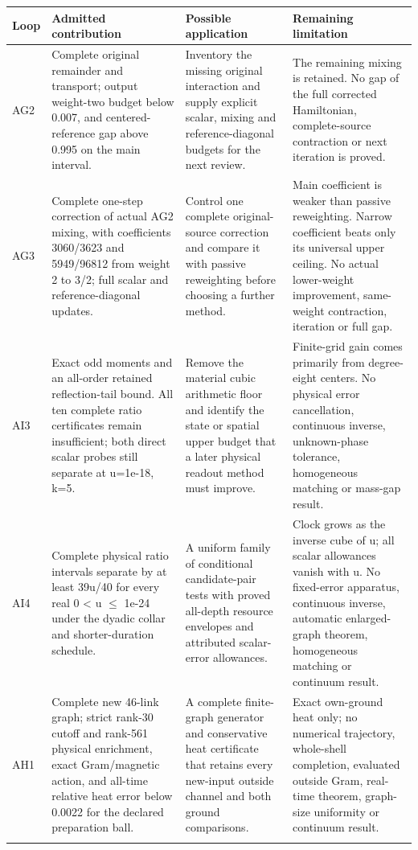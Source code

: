 \begingroup\small
\begin{longtable}{@{}>{\raggedright\arraybackslash}p{13mm}>{\raggedright\arraybackslash}p{52mm}>{\raggedright\arraybackslash}p{35mm}>{\raggedright\arraybackslash}p{48mm}@{}}
\toprule Loop & Admitted contribution & Possible application & Remaining limitation \\
\midrule\endhead
AG2 & Complete original remainder and transport; output weight-two budget below 0.007, and centered-reference gap above 0.995 on the main interval. & Inventory the missing original interaction and supply explicit scalar, mixing and reference-diagonal budgets for the next review. & The remaining mixing is retained. No gap of the full corrected Hamiltonian, complete-source contraction or next iteration is proved. \\ \addlinespace
AG3 & Complete one-step correction of actual AG2 mixing, with coefficients 3060/3623 and 5949/96812 from weight 2 to 3/2; full scalar and reference-diagonal updates. & Control one complete original-source correction and compare it with passive reweighting before choosing a further method. & Main coefficient is weaker than passive reweighting. Narrow coefficient beats only its universal upper ceiling. No actual lower-weight improvement, same-weight contraction, iteration or full gap. \\ \addlinespace
AI3 & Exact odd moments and an all-order retained reflection-tail bound. All ten complete ratio certificates remain insufficient; both direct scalar probes still separate at u=1e-18, k=5. & Remove the material cubic arithmetic floor and identify the state or spatial upper budget that a later physical readout method must improve. & Finite-grid gain comes primarily from degree-eight centers. No physical error cancellation, continuous inverse, unknown-phase tolerance, homogeneous matching or mass-gap result. \\ \addlinespace
AI4 & Complete physical ratio intervals separate by at least 39u/40 for every real 0 < u $\le$ 1e-24 under the dyadic collar and shorter-duration schedule. & A uniform family of conditional candidate-pair tests with proved all-depth resource envelopes and attributed scalar-error allowances. & Clock grows as the inverse cube of u; all scalar allowances vanish with u. No fixed-error apparatus, continuous inverse, automatic enlarged-graph theorem, homogeneous matching or continuum result. \\ \addlinespace
AH1 & Complete new 46-link graph; strict rank-30 cutoff and rank-561 physical enrichment, exact Gram/magnetic action, and all-time relative heat error below 0.0022 for the declared preparation ball. & A complete finite-graph generator and conservative heat certificate that retains every new-input outside channel and both ground comparisons. & Exact own-ground heat only; no numerical trajectory, whole-shell completion, evaluated outside Gram, real-time theorem, graph-size uniformity or continuum result. \\ \addlinespace

\end{longtable}
